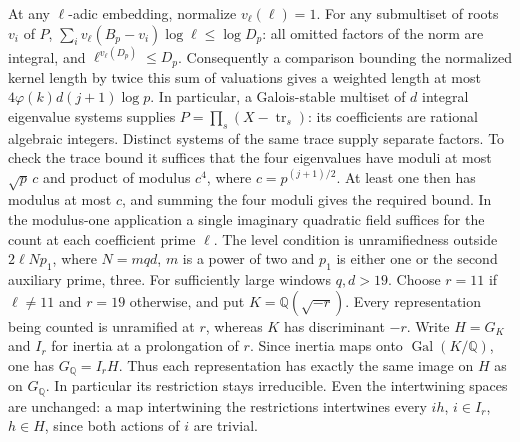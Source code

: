\documentclass[11pt]{amsart}
\theoremstyle{definition}
\theoremstyle{remark}
\begin{document}
At any $\ell$-adic embedding, normalize $v_\ell(\ell)=1$.
For any submultiset of roots $v_i$ of $P$,
$\sum_i v_\ell(B_p-v_i)\log\ell\le\log D_p$:
all omitted factors of the norm are integral, and
$\ell^{v_\ell(D_p)}\le D_p$. Consequently a comparison bounding
the normalized kernel length by twice this sum of valuations gives
a weighted length at most $4\varphi(k)d(j+1)\log p$.
In particular, a Galois-stable multiset of $d$ integral eigenvalue
systems supplies $P=\prod_s(X-\operatorname{tr}_s)$: its coefficients
are rational algebraic integers. Distinct systems of the same trace
supply separate factors. To check the trace bound it suffices that
the four eigenvalues have moduli at most $\sqrt p\,c$ and product of
modulus $c^4$, where $c=p^{(j+1)/2}$. At least one then has modulus
at most $c$, and summing the four moduli gives the required bound.
In the modulus-one application a single imaginary quadratic field
suffices for the count at each coefficient prime $\ell$. The level
condition is unramifiedness outside $2\ell Np_1$, where $N=mqd$,
$m$ is a power of two and $p_1$ is either one or the second auxiliary
prime, three. For sufficiently large windows $q,d>19$. Choose
$r=11$ if $\ell\ne11$ and $r=19$ otherwise, and put
$K=\mathbb Q(\sqrt{-r})$. Every representation being counted is
unramified at $r$, whereas $K$ has discriminant $-r$.
Write $H=G_K$ and $I_r$ for inertia at a prolongation of $r$.
Since inertia maps onto $\operatorname{Gal}(K/\mathbb Q)$, one
has $G_{\mathbb Q}=I_r H$. Thus each representation has exactly
the same image on $H$ as on $G_{\mathbb Q}$. In particular its
restriction stays irreducible. Even the intertwining spaces are
unchanged: a map intertwining the restrictions intertwines every
$ih$, $i\in I_r$, $h\in H$, since both actions of $i$ are trivial.
\end{document}
